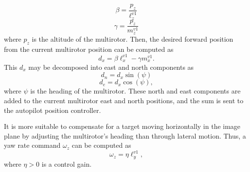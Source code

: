 \begin{equation}
\beta=\frac{p_z}{\ell^{v1}_z}
\end{equation} 
\begin{equation}
\gamma=\frac{p_z}{m^{v1}_z}
\end{equation} where $p_z$ is the altitude of the multirotor. Then, the desired forward position from the current multirotor position can be computed as 
\begin{equation}
d_x=\beta\ell^{v1}_x-\gamma{m}^{v1}_x.
\end{equation}
This $d_x$ may be decomposed into east and north components as
\begin{equation}
d_n=d_x\sin(\psi)
\end{equation}
\begin{equation}
d_e=d_x\cos(\psi),
\end{equation} where $\psi$ is the heading of the multirotor. These north and east components are added to the current multirotor east and north positions, and the sum is sent to the autopilot position controller.

It is more suitable to compensate for a target moving horizontally in the image plane by adjusting the multirotor's heading than through lateral motion. Thus, a yaw rate command $\omega_z$ can be computed as 
\begin{equation}
\omega_z=\eta \ell^{v1}_y,
\end{equation} where $\eta>0$ is a control gain.

